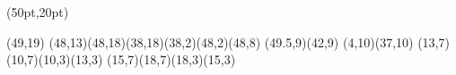 

\PapierGroesse(50pt,20pt)



\hskip-1.3pt
\begin{psfigur}[clip=nein,rahmen=nein](49,19)%
\psLinie[linienbreite=3,eckradius=5pt](48,13)(48,18)(38,18)(38,2)(48,2)(48,8)%
\psLinie[linienbreite=3](49.5,9)(42,9)
\psLinie[linienbreite=4pt,linienrand=c](4,10)(37,10)%
\psLinie(13,7)(10,7)(10,3)(13,3)
\psLinie(15,7)(18,7)(18,3)(15,3)
\end{psfigur}

